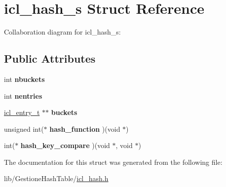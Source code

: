 \hypertarget{structicl__hash__s}{}\section{icl\+\_\+hash\+\_\+s Struct Reference}
\label{structicl__hash__s}


Collaboration diagram for icl\+\_\+hash\+\_\+s\+:
\subsection*{Public Attributes}
\begin{DoxyCompactItemize}
\item 
\mbox{\label{structicl__hash__s_a18d5f1bc101356322a4db7a6cfeb9f7e}} 
int {\bfseries nbuckets}
\item 
\mbox{\label{structicl__hash__s_a7654114080ad222e0b8c2311ef3466fa}} 
int {\bfseries nentries}
\item 
\mbox{\label{structicl__hash__s_a8d8b17cad1aca47e27486e4f49882df4}} 
\hyperlink{structicl__entry__s}{icl\+\_\+entry\+\_\+t} $\ast$$\ast$ {\bfseries buckets}
\item 
\mbox{\label{structicl__hash__s_a06d96a5a8f9015e2ee6d6bf2e0876971}} 
unsigned int($\ast$ {\bfseries hash\+\_\+function} )(void $\ast$)
\item 
\mbox{\label{structicl__hash__s_a6e3fc8d3a066a9c8fd5f45161119874e}} 
int($\ast$ {\bfseries hash\+\_\+key\+\_\+compare} )(void $\ast$, void $\ast$)
\end{DoxyCompactItemize}


The documentation for this struct was generated from the following file\+:\begin{DoxyCompactItemize}
\item 
lib/\+Gestione\+Hash\+Table/\hyperlink{icl__hash_8h}{icl\+\_\+hash.\+h}\end{DoxyCompactItemize}
